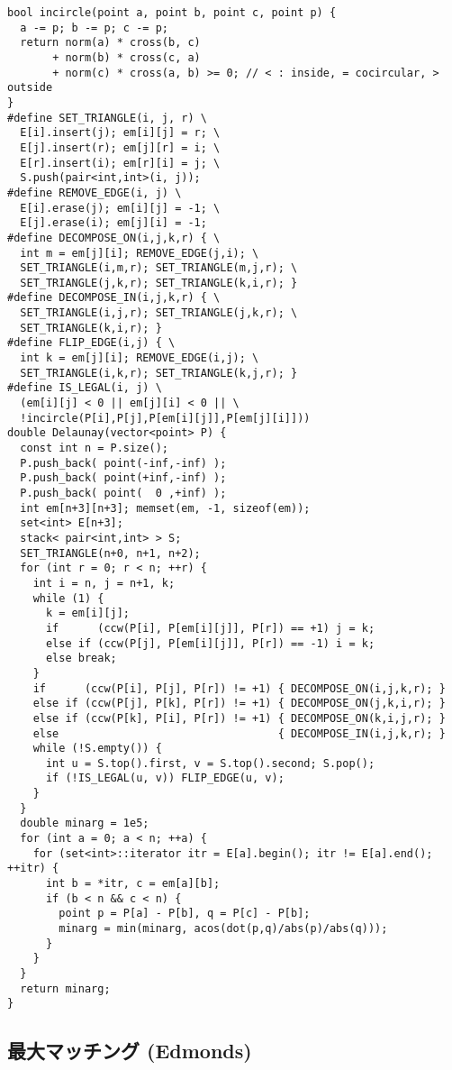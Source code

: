 \begin{lstlisting}
bool incircle(point a, point b, point c, point p) {
  a -= p; b -= p; c -= p;
  return norm(a) * cross(b, c)
       + norm(b) * cross(c, a)
       + norm(c) * cross(a, b) >= 0; // < : inside, = cocircular, > outside
}
#define SET_TRIANGLE(i, j, r) \
  E[i].insert(j); em[i][j] = r; \
  E[j].insert(r); em[j][r] = i; \
  E[r].insert(i); em[r][i] = j; \
  S.push(pair<int,int>(i, j));
#define REMOVE_EDGE(i, j) \
  E[i].erase(j); em[i][j] = -1; \
  E[j].erase(i); em[j][i] = -1;
#define DECOMPOSE_ON(i,j,k,r) { \
  int m = em[j][i]; REMOVE_EDGE(j,i); \
  SET_TRIANGLE(i,m,r); SET_TRIANGLE(m,j,r); \
  SET_TRIANGLE(j,k,r); SET_TRIANGLE(k,i,r); }
#define DECOMPOSE_IN(i,j,k,r) { \
  SET_TRIANGLE(i,j,r); SET_TRIANGLE(j,k,r); \
  SET_TRIANGLE(k,i,r); }
#define FLIP_EDGE(i,j) { \
  int k = em[j][i]; REMOVE_EDGE(i,j); \
  SET_TRIANGLE(i,k,r); SET_TRIANGLE(k,j,r); }
#define IS_LEGAL(i, j) \
  (em[i][j] < 0 || em[j][i] < 0 || \
  !incircle(P[i],P[j],P[em[i][j]],P[em[j][i]]))
double Delaunay(vector<point> P) {
  const int n = P.size();
  P.push_back( point(-inf,-inf) );
  P.push_back( point(+inf,-inf) );
  P.push_back( point(  0 ,+inf) );
  int em[n+3][n+3]; memset(em, -1, sizeof(em));
  set<int> E[n+3];
  stack< pair<int,int> > S;
  SET_TRIANGLE(n+0, n+1, n+2);
  for (int r = 0; r < n; ++r) {
    int i = n, j = n+1, k;
    while (1) {
      k = em[i][j];
      if      (ccw(P[i], P[em[i][j]], P[r]) == +1) j = k;
      else if (ccw(P[j], P[em[i][j]], P[r]) == -1) i = k;
      else break;
    }
    if      (ccw(P[i], P[j], P[r]) != +1) { DECOMPOSE_ON(i,j,k,r); }
    else if (ccw(P[j], P[k], P[r]) != +1) { DECOMPOSE_ON(j,k,i,r); }
    else if (ccw(P[k], P[i], P[r]) != +1) { DECOMPOSE_ON(k,i,j,r); }
    else                                  { DECOMPOSE_IN(i,j,k,r); }
    while (!S.empty()) {
      int u = S.top().first, v = S.top().second; S.pop();
      if (!IS_LEGAL(u, v)) FLIP_EDGE(u, v);
    }
  }
  double minarg = 1e5;
  for (int a = 0; a < n; ++a) {
    for (set<int>::iterator itr = E[a].begin(); itr != E[a].end(); ++itr) {
      int b = *itr, c = em[a][b];
      if (b < n && c < n) {
        point p = P[a] - P[b], q = P[c] - P[b];
        minarg = min(minarg, acos(dot(p,q)/abs(p)/abs(q)));
      }
    }
  }
  return minarg;
}
\end{lstlisting}



\subsection{最大マッチング (Edmonds)}


